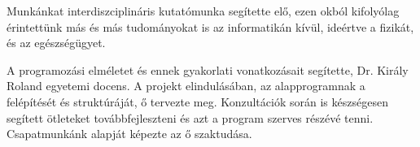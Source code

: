 \documentclass[tocnopagenum]{thesis-ekf}
\theoremstyle{definition}
\theoremstyle{remark}
\begin{document}
	Munkánkat interdiszciplináris kutatómunka segítette elő, ezen okból kifolyólag érintettünk más és más tudományokat is az informatikán kívül, ideértve a fizikát, és az egészségügyet.
	
	A programozási elméletet és ennek gyakorlati vonatkozásait segítette, Dr. Király Roland  egyetemi docens. A projekt elindulásában, az alapprogramnak a felépítését és struktúráját, ő tervezte meg. Konzultációk során is készségesen segített ötleteket továbbfejleszteni és azt a program szerves részévé tenni. 
	Csapatmunkánk alapját képezte az ő szaktudása.

\end{document}
